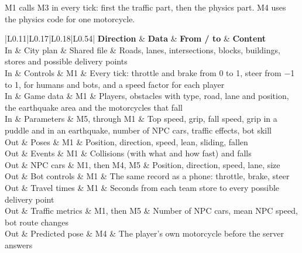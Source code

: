 \documentclass[
  english,
  10pt,
  a4paper,
]{article}
\newcommand{\ckkeep}[1]{\par\noindent\begin{minipage}{\linewidth}\setlength{\parskip}{4pt}#1\end{minipage}\par\smallskip}
\begin{document}
\ckkeep{%
M1 calls M3 in every tick: first the traffic part, then the physics part. M4 uses the physics code for
one motorcycle.

\begin{tabular}{|L{0.11}|L{0.17}|L{0.18}|L{0.54}|}
\hline \textbf{Direction} & \textbf{Data} & \textbf{From / to} & \textbf{Content} \\ \hline 
In & City plan & Shared file & Roads, lanes, intersections, blocks, buildings, stores and possible delivery points \\ \hline
In & Controls & M1 & Every tick: throttle and brake from 0 to 1, steer from −1 to 1, for humans and bots, and a speed factor for each player \\ \hline
In & Game data & M1 & Players, obstacles with type, road, lane and position, the earthquake area and the motorcycles that fall \\ \hline
In & Parameters & M5, through M1 & Top speed, grip, fall speed, grip in a puddle and in an earthquake, number of NPC cars, traffic effects, bot skill \\ \hline
Out & Poses & M1 & Position, direction, speed, lean, sliding, fallen \\ \hline
Out & Events & M1 & Collisions (with what and how fast) and falls \\ \hline
Out & NPC cars & M1, then M4, M5 & Position, direction, speed, lane, size \\ \hline
Out & Bot controls & M1 & The same record as a phone: throttle, brake, steer \\ \hline
Out & Travel times & M1 & Seconds from each team store to every possible delivery point \\ \hline
Out & Traffic metrics & M1, then M5 & Number of NPC cars, mean NPC speed, bot route changes \\ \hline
Out & Predicted pose & M4 & The player's own motorcycle before the server answers \\ \hline
\end{tabular}}

\end{document}
